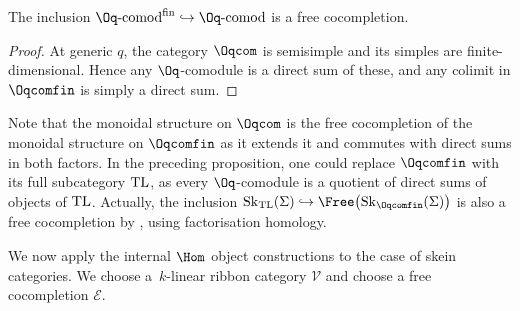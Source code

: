 \begin{Proposition}\label{propOqFree}
The inclusion $\Oq\text{-}{\rm comod}^{\rm fin} \hookrightarrow \Oq\text{-}{\rm comod}$ is a free cocompletion.
\end{Proposition}
\begin{proof}
At generic $q$, the category $\Oqcom$ is semisimple and its simples are finite-dimen\-sio\-nal. Hence any $\Oq$-comodule is a direct sum of these, and any colimit in \linebreak $\Oqcomfin$ is simply a direct sum.
\end{proof}

Note that the monoidal structure on $\Oqcom$ is the free cocompletion of the monoidal structure on $\Oqcomfin$ as it extends it and commutes with direct sums in both factors.
In the preceding proposition, one could replace $\Oqcomfin$ with its full subcategory ${\rm TL}$, as every $\Oq$-comodule is a quotient of direct sums of objects of ${\rm TL}$. Actually, the inclusion ${\rm Sk}_{{\rm TL}}(\Sigma) \hookrightarrow \Free\big({\rm Sk}_{\Oqcomfin}(\Sigma)\big)$ is also a free cocompletion by \cite[Theorems~2.28 and~3.27]{Cooke}, using factorisation homology.

We now apply the internal $\Hom$ object constructions to the case of skein categories. We choose a~$k$-linear ribbon category $\mathcal{V}$ and choose a free cocompletion $\mathcal{E}$.

